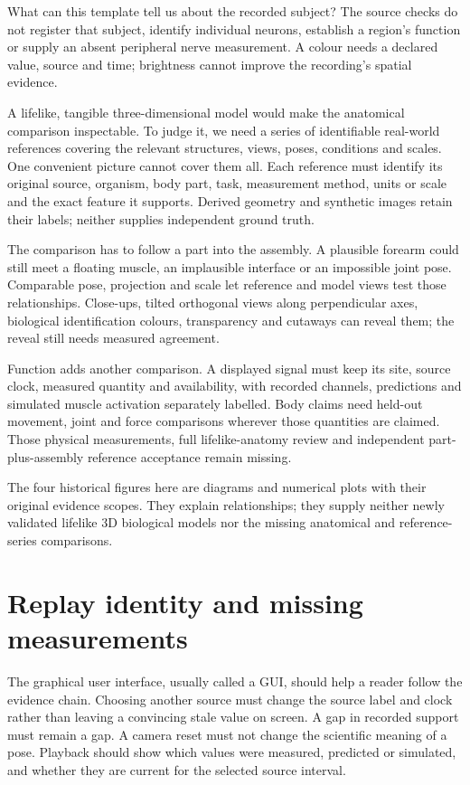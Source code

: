 What can this template tell us about the recorded subject? The source checks
do not register that subject, identify individual neurons, establish a region's
function or supply an absent peripheral nerve measurement. A colour needs a
declared value, source and time; brightness cannot improve the recording's
spatial evidence.

A lifelike, tangible three-dimensional model would make the anatomical
comparison inspectable. To judge it, we need a series of identifiable real-world
references covering the relevant structures, views, poses, conditions and scales.
One convenient picture cannot cover them all. Each reference must identify its
original source, organism, body part, task, measurement method, units or scale
and the exact feature it supports. Derived geometry and synthetic images retain
their labels; neither supplies independent ground truth.

The comparison has to follow a part into the assembly. A plausible forearm
could still meet a floating muscle, an implausible interface or an impossible
joint pose. Comparable pose, projection and scale let reference and model views
test those relationships. Close-ups, tilted orthogonal views along perpendicular
axes, biological identification colours, transparency and cutaways can reveal
them; the reveal still needs measured agreement.

Function adds another comparison. A displayed signal must keep its site, source
clock, measured quantity and availability, with recorded channels, predictions
and simulated muscle activation separately labelled. Body claims need held-out
movement, joint and force comparisons wherever those quantities are claimed.
Those physical measurements, full lifelike-anatomy review and independent
part-plus-assembly reference acceptance remain missing.

The four historical figures here are diagrams and numerical plots with their
original evidence scopes. They explain relationships; they supply neither
newly validated lifelike 3D biological models nor the missing anatomical and
reference-series comparisons.

\section{Replay identity and missing measurements}

The graphical user interface, usually called a GUI, should help a reader follow
the evidence chain. Choosing another source must change the source label and
clock rather than leaving a convincing stale value on screen. A gap in recorded
support must remain a gap. A camera reset must not change the scientific meaning
of a pose. Playback should show which values were measured, predicted or
simulated, and whether they are current for the selected source interval.

